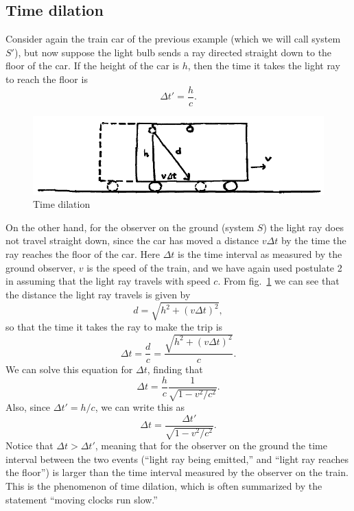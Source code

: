 \subsection{Time dilation}

Consider again the train car of the previous example (which we will call system $S'$), but now suppose the light bulb sends a ray directed straight down to the floor of the car. If the height of the car is $h$, then the time it takes the light ray to reach the floor is
\begin{equation}
\Delta t'=\frac{h}{c}.
\end{equation}
\begin{figure}[ht]
\begin{center}
\includegraphics[scale=0.6]{Draw/lec2_2.png}
\end{center}
\caption{Time dilation}
\label{fig:lec2_2}
\end{figure}

\noindent
On the other hand, for the observer on the ground (system $S$) the light ray does not travel straight down, since the car has moved a distance $v\Delta t$ by the time the ray reaches the floor of the car. Here $\Delta t$ is the time interval as measured by the ground observer, $v$ is the speed of the train, and we have again used postulate 2 in assuming that the light ray travels with speed $c$. From fig.\ \ref{fig:lec2_2} we can see that the distance the light ray travels is given by
\begin{equation}
d=\sqrt{h^2+(v\Delta t)^2},
\end{equation}
so that the time it takes the ray to make the trip is
\begin{equation}
\Delta t=\frac{d}{c}=\frac{\sqrt{h^2+(v\Delta t)^2}}{c}.
\end{equation}
We can solve this equation for $\Delta t$, finding that
\begin{equation}
\Delta t=\frac{h}{c}\frac{1}{\sqrt{1-v^2/c^2}}.
\end{equation}
Also, since $\Delta t'=h/c$, we can write this as
\begin{equation} \label{eq:time_dilation}
\Delta t=\frac{\Delta t'}{\sqrt{1-v^2/c^2}}.
\end{equation}
Notice that $\Delta t>\Delta t'$, meaning that for the observer on the ground the time interval between the two events (``light ray being emitted,'' and ``light ray reaches the floor'') is larger than the time interval measured by the observer on the train. This is the phenomenon of time dilation, which is often summarized by the statement ``moving clocks run slow.''

